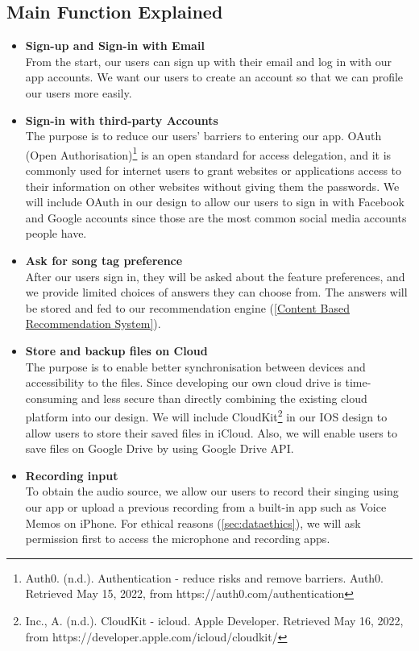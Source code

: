  \subsection{Main Function Explained}

\begin{itemize}

\item \textbf{Sign-up and Sign-in with Email}
\\From the start, our users can sign up with their email and log in with our app accounts. We want our users to create an account so that we can profile our users more easily.

\item \textbf{Sign-in with third-party Accounts}
\\ The purpose is to reduce our users' barriers to entering our app. OAuth (Open Authorisation)\footnote{Auth0. (n.d.). Authentication - reduce risks and remove barriers. Auth0. Retrieved May 15, 2022, from https://auth0.com/authentication } is an open standard for access delegation, and it is commonly used for internet users to grant websites or applications access to their information on other websites without giving them the passwords. We will include OAuth in our design to allow our users to sign in with Facebook and Google accounts since those are the most common social media accounts people have.

\item \textbf{Ask for song tag preference}
\\After our users sign in, they will be asked about the feature preferences, and we provide limited choices of answers they can choose from. The answers will be stored and fed to our recommendation engine (\cref{Content Based Recommendation System}). 

\item \textbf{Store and backup files on Cloud}
\\The purpose is to enable better synchronisation between devices and accessibility to the files. Since developing our own cloud drive is time-consuming and less secure than directly combining the existing cloud platform into our design. 
We will include CloudKit\footnote{Inc., A. (n.d.). CloudKit - icloud. Apple Developer. Retrieved May 16, 2022, from https://developer.apple.com/icloud/cloudkit/} in our IOS design to allow users to store their saved files in iCloud. Also, we will enable users to save files on Google Drive by using Google Drive API.

\item \textbf{Recording input}
\\ To obtain the audio source, we allow our users to record their singing using our app or upload a previous recording 
from a built-in app such as Voice Memos on iPhone. For ethical reasons (\cref{sec:dataethics}), we will ask permission first to access the microphone and recording apps.


\end{itemize}
